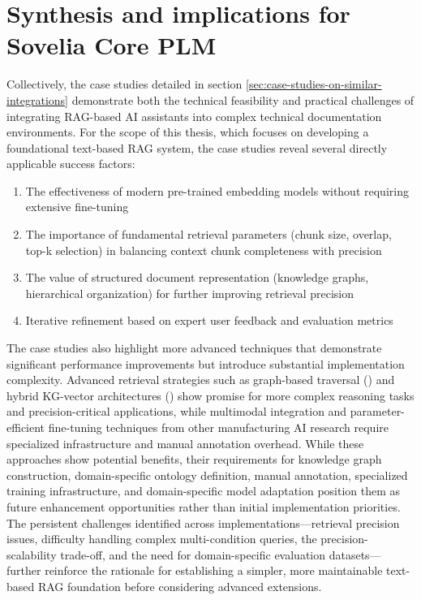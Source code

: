 \section{Synthesis and implications for Sovelia Core PLM}

Collectively, the case studies detailed in section \ref{sec:case-studies-on-similar-integrations} demonstrate both the technical feasibility and practical challenges of integrating RAG-based AI assistants into complex technical documentation environments. For the scope of this thesis, which focuses on developing a foundational text-based RAG system, the case studies reveal several directly applicable success factors:

\begin{enumerate}
    \item The effectiveness of modern pre-trained embedding models without requiring extensive fine-tuning
    \item The importance of fundamental retrieval parameters (chunk size, overlap, top-k selection) in balancing context chunk completeness with precision
    \item The value of structured document representation (knowledge graphs, hierarchical organization) for further improving retrieval precision
    \item Iterative refinement based on expert user feedback and evaluation metrics
\end{enumerate}

The case studies also highlight more advanced techniques that demonstrate significant performance improvements but introduce substantial implementation complexity. Advanced retrieval strategies such as graph-based traversal (\textcite{knollmeyer_document_2025}) and hybrid KG-vector architectures (\textcite{wang_artificial_2021}) show promise for more complex reasoning tasks and precision-critical applications, while multimodal integration and parameter-efficient fine-tuning techniques from other manufacturing AI research require specialized infrastructure and manual annotation overhead. While these approaches show potential benefits, their requirements for knowledge graph construction, domain-specific ontology definition, manual annotation, specialized training infrastructure, and domain-specific model adaptation position them as future enhancement opportunities rather than initial implementation priorities. The persistent challenges identified across implementations—retrieval precision issues, difficulty handling complex multi-condition queries, the precision-scalability trade-off, and the need for domain-specific evaluation datasets—further reinforce the rationale for establishing a simpler, more maintainable text-based RAG foundation before considering advanced extensions.

